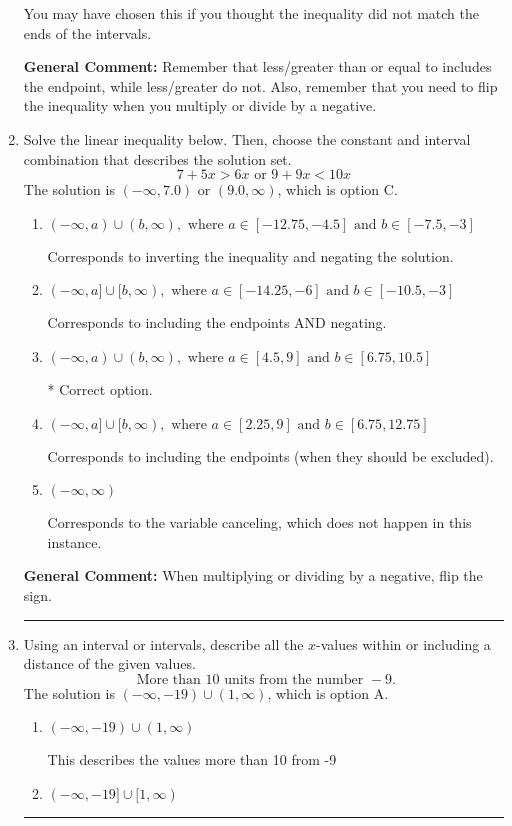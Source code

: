 \documentclass{extbook}[14pt]
\newcommand{\litem}[1]{\item #1

\rule{\textwidth}{0.4pt}}
\begin{document}
\begin{enumerate}
{\begin{enumerate}[label=\Alph*.]
You may have chosen this if you thought the inequality did not match the ends of the intervals.
\end{enumerate}

\textbf{General Comment:} Remember that less/greater than or equal to includes the endpoint, while less/greater do not. Also, remember that you need to flip the inequality when you multiply or divide by a negative.
}
\litem{
Solve the linear inequality below. Then, choose the constant and interval combination that describes the solution set.
\[ 7 + 5 x > 6 x \text{ or } 9 + 9 x < 10 x \]The solution is \( (-\infty, 7.0) \text{ or } (9.0, \infty) \), which is option C.\begin{enumerate}[label=\Alph*.]
\item \( (-\infty, a) \cup (b, \infty), \text{ where } a \in [-12.75, -4.5] \text{ and } b \in [-7.5, -3] \)

Corresponds to inverting the inequality and negating the solution.
\item \( (-\infty, a] \cup [b, \infty), \text{ where } a \in [-14.25, -6] \text{ and } b \in [-10.5, -3] \)

Corresponds to including the endpoints AND negating.
\item \( (-\infty, a) \cup (b, \infty), \text{ where } a \in [4.5, 9] \text{ and } b \in [6.75, 10.5] \)

 * Correct option.
\item \( (-\infty, a] \cup [b, \infty), \text{ where } a \in [2.25, 9] \text{ and } b \in [6.75, 12.75] \)

Corresponds to including the endpoints (when they should be excluded).
\item \( (-\infty, \infty) \)

Corresponds to the variable canceling, which does not happen in this instance.
\end{enumerate}

\textbf{General Comment:} When multiplying or dividing by a negative, flip the sign.
}
\litem{
Using an interval or intervals, describe all the $x$-values within or including a distance of the given values.
\[ \text{ More than } 10 \text{ units from the number } -9. \]The solution is \( (-\infty, -19) \cup (1, \infty) \), which is option A.\begin{enumerate}[label=\Alph*.]
\item \( (-\infty, -19) \cup (1, \infty) \)

This describes the values more than 10 from -9
\item \( (-\infty, -19] \cup [1, \infty) \)


\end{enumerate}}
\end{enumerate}
\end{document}
